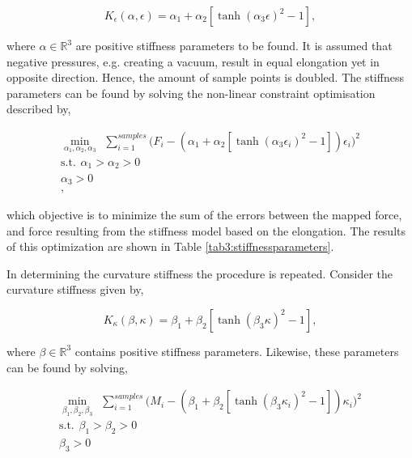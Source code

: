 \begin{equation}
    K_\epsilon(\alpha,\epsilon) =  \alpha_1 + \alpha_2 [\tanh({\alpha_3 \epsilon})^2 -1],
\end{equation}


where $\alpha \in \mathbb{R}^3$ are positive stiffness parameters to be found. It is assumed that negative pressures, e.g. creating a vacuum, result in equal elongation yet in opposite direction. Hence, the amount of sample points is doubled. The stiffness parameters can be found by solving the non-linear constraint optimisation described by,


\begin{equation}
\begin{aligned}
\min_{\alpha_1,\alpha_2,\alpha_3} \hspace{5pt} \sum_{i=1}^{samples}\Big(F_i -  (\alpha_1 + \alpha_2 [\tanh({\alpha_3 \epsilon_i})^2 -1])\epsilon_i\Big)^2    \\ 
\text{s.t.} \hspace{5pt} \alpha_1 > \alpha_2 > 0 \\
\alpha_3 > 0 \\ ,
\label{eq3:Keopt}
\end{aligned}
\end{equation}

which objective is to minimize the sum of the errors between the mapped force, and force resulting from the stiffness model based on the elongation. The results of this optimization are shown in Table \ref{tab3:stiffnessparameters}.

In determining the curvature stiffness the procedure is repeated. Consider the curvature stiffness given by,

\begin{equation}
    K_\kappa(\beta,\kappa) =  \beta_1 + \beta_2 [\tanh({\beta_3 \kappa})^2 -1],
\end{equation}

where $\beta \in \mathbb{R}^3$ contains positive stiffness parameters. Likewise, these parameters can be found by solving,

\begin{equation}
\begin{aligned}
\min_{\beta_1,\beta_2,\beta_3} \hspace{5pt} \sum_{i=1}^{samples}\big(M_i -  (\beta_1 + \beta_2 [\tanh({\beta_3 {\kappa_i}})^2 -1]){\kappa_i}\Big)^2    \\ 
\text{s.t.} \hspace{5pt} \beta_1 > \beta_2 > 0 \\
\beta_3 > 0 \\ 
\label{eq3:Kkopt}
\end{aligned}
\end{equation}


